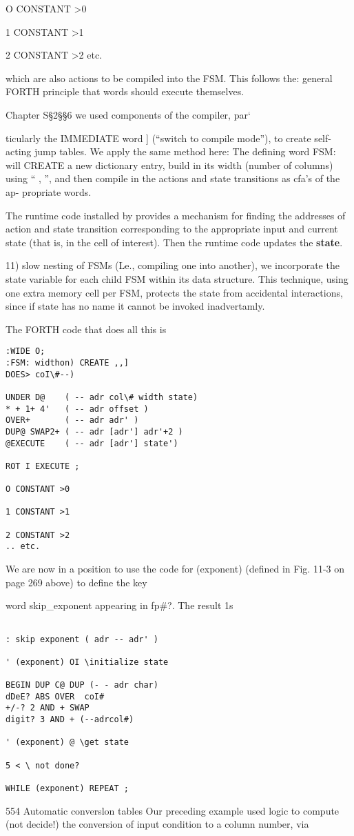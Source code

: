  

O CONSTANT >0

1 CONSTANT >1

2 CONSTANT >2
etc.

which are also actions to be compiled into the FSM. This follows the:
general FORTH principle that words should execute themselves.

 Chapter S§2§§6 we used components of the compiler, par‘

ticularly the IMMEDIATE word ] (“switch to compile mode”),
to create self-acting jump tables. We apply the same method here:
The defining word FSM: will CREATE a new dictionary entry,
build in its width (number of columns) using “ , ”, and then
compile in the actions and state transitions as cfa’s of the ap-
propriate words.

The runtime code installed by  provides a mechanism for finding the addresses of action and state transition corresponding to the appropriate input and current state (that is, in the cell of interest). Then the runtime code updates the \textbf{state}.

11) slow nesting of FSMs (Le., compiling one into another), we
incorporate the state variable for each child FSM within its data
structure. This technique, using one extra memory cell per FSM,
protects the state from accidental interactions, since if state has
no name it cannot be invoked inadvertamly.

The FORTH code that does all this is
\begin{verbatim}
:WIDE O;
:FSM: widthon) CREATE ,,]
DOES> coI\#--)

UNDER D@    ( -- adr col\# width state)
* + 1+ 4'   ( -- adr offset )
OVER+       ( -- adr adr' )
DUP@ SWAP2+ ( -- adr [adr'] adr'+2 )
@EXECUTE    ( -- adr [adr'] state')

ROT I EXECUTE ;

O CONSTANT >0

1 CONSTANT >1

2 CONSTANT >2
.. etc.

\end{verbatim}

We are now in a position to use the code for (exponent)
(defined in Fig. 11-3 on page 269 above) to define the key

word skip\_exponent appearing in fp\#?. The result 1s

\begin{verbatim}

: skip exponent ( adr -- adr' )

' (exponent) OI \initialize state

BEGIN DUP C@ DUP (- - adr char)
dDeE? ABS OVER  coI#
+/-? 2 AND + SWAP
digit? 3 AND + (--adrcol#)

' (exponent) @ \get state

5 < \ not done?

WHILE (exponent) REPEAT ;
\end{verbatim}
554 Automatic converslon tables
Our preceding example used logic to compute (not decide!) the
conversion of input condition to a column number, via


